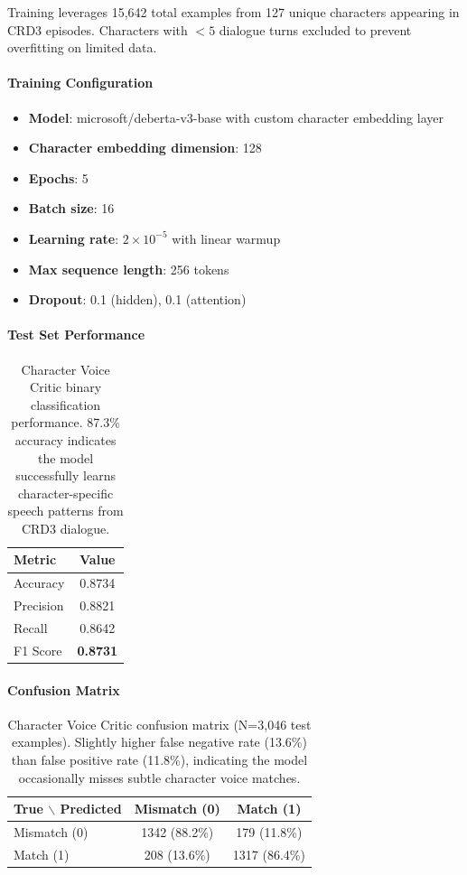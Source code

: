 \documentclass[11pt]{article}
\begin{document}
Training leverages 15,642 total examples from 127 unique characters appearing in CRD3 episodes. Characters with $<5$ dialogue turns excluded to prevent overfitting on limited data.

\paragraph{Training Configuration}
\begin{itemize}
    \item \textbf{Model}: microsoft/deberta-v3-base with custom character embedding layer
    \item \textbf{Character embedding dimension}: 128
    \item \textbf{Epochs}: 5
    \item \textbf{Batch size}: 16
    \item \textbf{Learning rate}: $2 \times 10^{-5}$ with linear warmup
    \item \textbf{Max sequence length}: 256 tokens
    \item \textbf{Dropout}: 0.1 (hidden), 0.1 (attention)
\end{itemize}

\paragraph{Test Set Performance}
\begin{table}[h]
\centering
\begin{tabular}{lc}
\toprule
\textbf{Metric} & \textbf{Value} \\
\midrule
Accuracy & 0.8734 \\
Precision & 0.8821 \\
Recall & 0.8642 \\
F1 Score & \textbf{0.8731} \\
\bottomrule
\end{tabular}
\caption{Character Voice Critic binary classification performance. 87.3\% accuracy indicates the model successfully learns character-specific speech patterns from CRD3 dialogue.}
\label{tab:character_performance}
\end{table}

\paragraph{Confusion Matrix}

\begin{table}[h]
\centering
\begin{tabular}{lcc}
\toprule
\textbf{True $\backslash$ Predicted} & \textbf{Mismatch (0)} & \textbf{Match (1)} \\
\midrule
Mismatch (0) & 1342 (88.2\%) & 179 (11.8\%) \\
Match (1) & 208 (13.6\%) & 1317 (86.4\%) \\
\bottomrule
\end{tabular}
\caption{Character Voice Critic confusion matrix (N=3,046 test examples). Slightly higher false negative rate (13.6\%) than false positive rate (11.8\%), indicating the model occasionally misses subtle character voice matches.}
\end{table}
\end{document}
